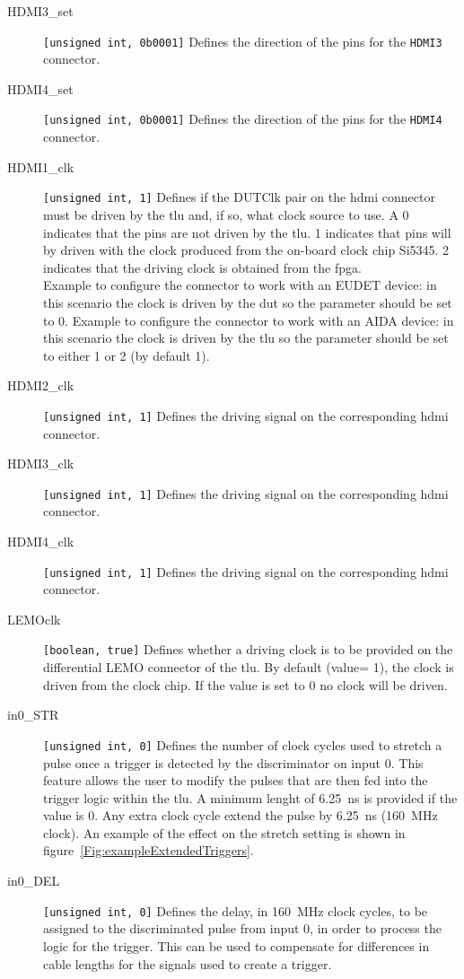 \begin{description}
  \item[HDMI3\_set] \verb|[unsigned int, 0b0001]| Defines the direction of the pins for the \verb|HDMI3| connector.
  \item[HDMI4\_set] \verb|[unsigned int, 0b0001]| Defines the direction of the pins for the \verb|HDMI4| connector.
  \item[HDMI1\_clk] \verb|[unsigned int, 1]| Defines if the DUTClk pair on the \gls{hdmi} connector must be driven by the \gls{tlu} and, if so, what clock source to use. A 0 indicates that the pins are not driven by the \gls{tlu}. 1 indicates that pins will by driven with the clock produced from the on-board clock chip Si5345. 2 indicates that the driving clock is obtained from the \gls{fpga}.\\
      Example to configure the connector to work with an EUDET device: in this scenario the clock is driven by the \gls{dut} so the parameter should be set to 0.
      Example to configure the connector to work with an AIDA device: in this scenario the clock is driven by the \gls{tlu} so the parameter should be set to either 1 or 2 (by default 1).
  \item[HDMI2\_clk] \verb|[unsigned int, 1]| Defines the driving signal on the corresponding \gls{hdmi} connector.
  \item[HDMI3\_clk] \verb|[unsigned int, 1]| Defines the driving signal on the corresponding \gls{hdmi} connector.
  \item[HDMI4\_clk] \verb|[unsigned int, 1]| Defines the driving signal on the corresponding \gls{hdmi} connector.
  \item[LEMOclk] \verb|[boolean, true]| Defines whether a driving clock is to be provided on the differential LEMO connector of the \gls{tlu}. By default (value= 1), the clock is driven from the clock chip. If the value is set to 0 no clock will be driven.
  \item[in0\_STR] \verb|[unsigned int, 0]| Defines the number of clock cycles used to stretch a pulse once a trigger is detected by the discriminator on input 0. This feature allows the user to modify the pulses that are then fed into the trigger logic within the \gls{tlu}.
      A minimum lenght of 6.25~ns is provided if the value is 0. Any extra clock cycle extend the pulse by 6.25~ns (160~MHz clock). An example of the effect on the stretch setting is shown in figure~\ref{Fig:exampleExtendedTriggers}.
  \item[in0\_DEL] \verb|[unsigned int, 0]| Defines the delay, in 160~MHz clock cycles, to be assigned to the discriminated pulse from input 0, in order to process the logic for the trigger. This can be used to compensate for differences in cable lengths for the signals used to create a trigger.

\end{description}
